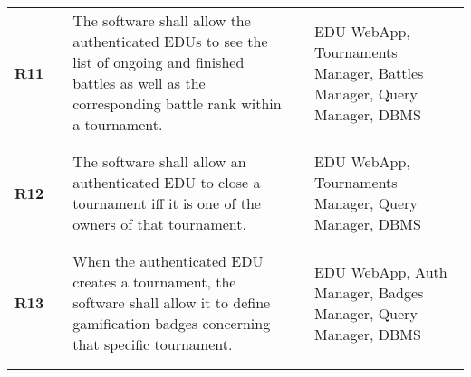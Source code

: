 \begin{longtable}[H]{l l p{6cm} l p{4cm}}
    \textbf{R11}            & \vline & The software shall allow the authenticated EDUs to see the list of ongoing and finished battles as well as the corresponding battle rank within a tournament.                                                                                                                & \vline &  EDU WebApp, Tournaments Manager, Battles Manager, Query Manager, DBMS                   \\          
                            &        &                                                                                                                                                                                                                                                                              &        &                                                                                          \\\hline & & \\ 
    \textbf{R12}            & \vline & The software shall allow an authenticated EDU to close a tournament iff it is one of the owners of that tournament.                                                                                                                                                          & \vline &  EDU WebApp, Tournaments Manager, Query Manager, DBMS                                    \\          
                            &        &                                                                                                                                                                                                                                                                              &        &                                                                                          \\\hline & & \\ 
    \textbf{R13}            & \vline & When the authenticated EDU creates a tournament, the software shall allow it to define gamification badges concerning that specific tournament.                                                                                                                              & \vline &  EDU WebApp, Auth Manager, Badges Manager, Query Manager, DBMS                           \\          
                            &        &                                                                                                                                                                                                                                                                              &        &                                                                                          \\\hline & & \\ 

\end{longtable}

